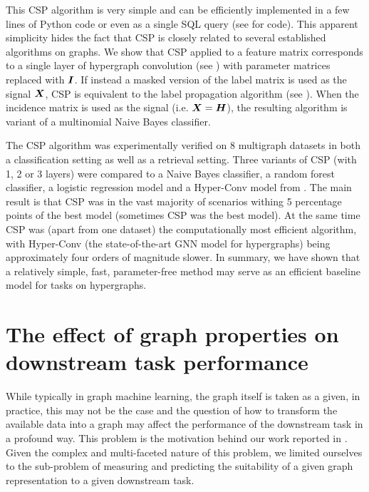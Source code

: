 This CSP algorithm is very simple and can be efficiently implemented in a few lines of Python code or even as a single SQL query (see \cite{prochazka_convolutional_2024} for code). This apparent simplicity hides the fact that CSP is closely related to several established algorithms on graphs. We show that CSP applied to a feature matrix corresponds to a single layer of hypergraph convolution (see \cite{bai_hypergraph_2021}) with parameter matrices replaced with \( \bm{I} \). If instead a masked version of the label matrix is used as the signal \( \bm{X} \), CSP is equivalent to the label propagation algorithm (see \cite{zhu_learning_2003}). When the incidence matrix is used as the signal (i.e. \( \bm{X} = \bm{H} \)), the resulting algorithm is variant of a multinomial Naive Bayes classifier.

The CSP algorithm was experimentally verified on 8 multigraph datasets in both a classification setting as well as a retrieval setting. Three variants of CSP (with 1, 2 or 3 layers) were compared to a Naive Bayes classifier, a random forest classifier, a logistic regression model and a Hyper-Conv model from \cite{bai_hypergraph_2021}. The main result is that CSP was in the vast majority of scenarios withing 5 percentage points of the best model (sometimes CSP was the best model). At the same time CSP was (apart from one dataset) the computationally most efficient algorithm, with Hyper-Conv (the state-of-the-art GNN model for hypergraphs) being approximately four orders of magnitude slower. In summary, we have shown that a relatively simple, fast, parameter-free method may serve as an efficient baseline model for tasks on hypergraphs.

\section{The effect of graph properties on downstream task performance}\label{sec:graph-property-effect}

While typically in graph machine learning, the graph itself is taken as a given, in practice, this may not be the case and the question of how to transform the available data into a graph may affect the performance of the downstream task in a profound way. This problem is the motivation behind our work reported in \cite{prochazka_which_2023}. Given the complex and multi-faceted nature of this problem, we limited ourselves to the sub-problem of measuring and predicting the suitability of a given graph representation to a given downstream task.

